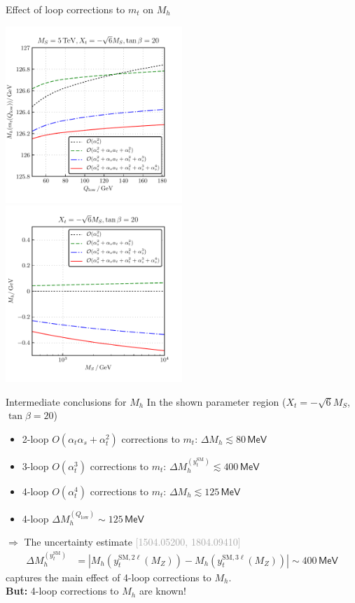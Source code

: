 \documentclass[hyperref={pdfpagelabels=false},ngerman]{beamer}
\newcommand{\eh}[1]{\,\mathsf{#1}}
\newcommand{\MeV}{\eh{MeV}}
\newcommand{\bigcite}[1]{\textcolor{darkgray}{[#1]}}
\renewcommand{\emph}{\textbf}
\newcommand{\SM}{\ensuremath{\text{SM}}}
\newcommand{\at}{\alpha_t}
\newcommand{\as}{\alpha_s}
\newcommand{\Loop}{\ensuremath{\ell}\xspace}
\newcommand{\Qlow}{\ensuremath{Q_\text{low}}}
\newcommand{\DMhHSSUSYytSM}{\ensuremath{\Delta M_h^{(y_t^\SM)}}}
\begin{document}
\begin{frame}{Effect of loop corrections to $m_t$ on $M_h$}
  \begin{center}
    \includegraphics[width=0.5\textwidth]{plots/kuts-10/Mh_Qlow_mt_2L_3LQCD_4LQCD}\hfill
    \includegraphics[width=0.5\textwidth]{plots/kuts-10/DMh_MS_mt_2L_3LQCD_4LQCD}
  \end{center}
\end{frame}

\begin{frame}{Intermediate conclusions for $M_h$}
  In the shown parameter region ($X_t = -\sqrt{6}M_S$, $\tan\beta = 20$)
  \begin{itemize}
  \item 2-loop $O(\at\as + \at^2)$ corrections to $m_t$: $\Delta M_h \lesssim 80\MeV$
  \item 3-loop $O(\at^3)$ corrections to $m_t$: $\DMhHSSUSYytSM \lesssim 400\MeV$
  \item 4-loop $O(\at^4)$ corrections to $m_t$: $\Delta M_h \lesssim 125\MeV$
  \item 4-loop $\Delta M_h^{(\Qlow)} \sim 125\MeV$
  \end{itemize}
  \vspace*{1em}
  $\Rightarrow$ The uncertainty estimate \bigcite{1504.05200, 1804.09410}
  \begin{align*}
    \DMhHSSUSYytSM &= \left| M_h(y_t^{\SM,2\Loop}(M_Z)) - M_h(y_t^{\SM,3\Loop}(M_Z)) \right| \sim 400\MeV
  \end{align*}
  captures the main effect of 4-loop corrections to $M_h$.\\[0.5em]
  \emph{But:} 4-loop corrections to $M_h$ are known!
\end{frame}
\end{document}
